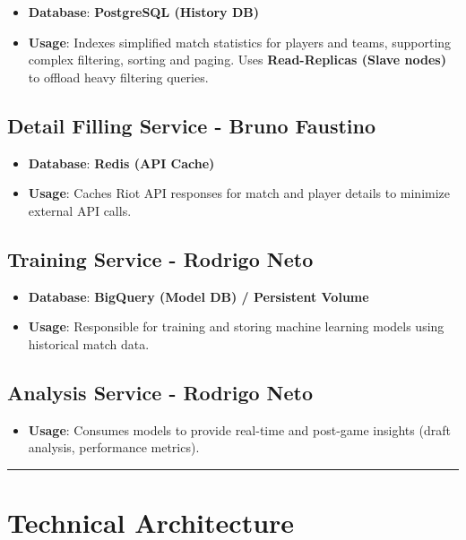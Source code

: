 \documentclass[11pt,a4paper]{article}
\newcommand{\bff}[1]{\textbf{#1}}
\begin{document}
 \begin{itemize}
  \item \bff{Database}: \bff{PostgreSQL (History DB)}
  \item \bff{Usage}: Indexes simplified match statistics for players and teams, supporting complex filtering, sorting and paging. Uses \bff{Read-Replicas (Slave nodes)} to offload heavy filtering queries.
 \end{itemize}
 
 \subsection{Detail Filling Service - Bruno Faustino}

 \begin{itemize}
  \item \bff{Database}: \bff{Redis (API Cache)}
  \item \bff{Usage}: Caches Riot API responses for match and player details to minimize external API calls.
 \end{itemize}

 \subsection{Training Service - Rodrigo Neto}
 
 \begin{itemize}
  \item \bff{Database}: \bff{BigQuery (Model DB) / Persistent Volume}
  \item \bff{Usage}: Responsible for training and storing machine learning models using historical match data.
 \end{itemize}
 
 \subsection{Analysis Service - Rodrigo Neto}
 
 \begin{itemize}
  \item \bff{Usage}: Consumes models to provide real-time and post-game insights (draft analysis, performance metrics).
 \end{itemize}

 \vspace{1cm}
 \hrule
 \vspace{1cm}
 
 \section{Technical Architecture}
\end{document}
